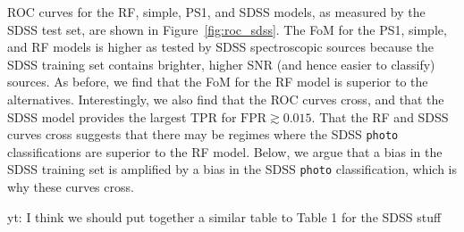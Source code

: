 \documentclass[twocolumn, dvipdfmx]{aastex62}
\newcommand{\yutaro}[1]{{\color{red} yt: {#1}}}
\begin{document}
ROC curves for the RF, simple, PS1, and SDSS models, as measured by the SDSS
test set, are shown in Figure~\ref{fig:roc_sdss}. The FoM for the PS1,
simple, and RF models is higher as tested by SDSS spectroscopic sources
because the SDSS training set contains brighter, higher SNR (and hence
easier to classify) sources. As before, we find that the FoM for the RF
model is superior to the alternatives. Interestingly, we also find that the
ROC curves cross, and that the SDSS model provides the largest TPR for
$\mathrm{FPR} \gtrsim 0.015$. That the RF and SDSS curves cross suggests
that there may be regimes where the SDSS \texttt{photo} classifications are
superior to the RF model. Below, we argue that a bias in the SDSS training
set is amplified by a bias in the SDSS \texttt{photo} classification, which
is why these curves cross.

\yutaro{I think we should put together a similar table to Table 1 for the SDSS stuff}


\end{document}
